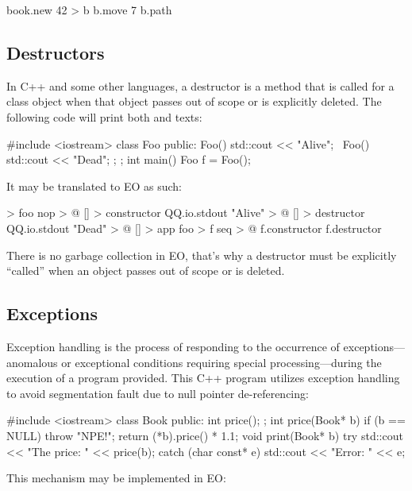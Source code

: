\documentclass[sigplan,11pt,nonacm,natbib=false]{acmart}
\begin{document}
\begin{ffcode}
book.new 42 > b
b.move 7
b.path
\end{ffcode}

\subsection{Destructors}
\label{sec:destructors}

In C++ and some other languages, a destructor is a method that is called for a class object when that object passes out of scope or is explicitly deleted. The following code will print both  and  texts:

\begin{ffcode}
#include <iostream>
class Foo {
public:
  Foo() { std::cout << "Alive"; }
  ~Foo() { std::cout << "Dead"; };
};
int main() {
  Foo f = Foo();
}
\end{ffcode}

It may be translated to EO as such:

\begin{ffcode}
[] > foo
  nop > @
  [] > constructor
    QQ.io.stdout "Alive" > @
  [] > destructor
    QQ.io.stdout "Dead" > @
[] > app
  foo > f
  seq > @
    f.constructor
    f.destructor
\end{ffcode}

There is no garbage collection in EO, that's why a destructor must be explicitly ``called'' when an object passes out of scope or is deleted.

\subsection{Exceptions}
\label{sec:exceptions}

Exception handling is the process of responding to the occurrence of exceptions---anomalous or exceptional conditions requiring special processing---during the execution of a program provided. This C++ program utilizes exception handling to avoid segmentation fault due to null pointer de-referencing:

\begin{ffcode}
#include <iostream>
class Book { public: int price(); };
int price(Book* b) {
  if (b == NULL) throw "NPE!";
  return (*b).price() * 1.1;
}
void print(Book* b) {
  try {
    std::cout << "The price: " << price(b);
  } catch (char const* e) {
    std::cout << "Error: " << e;
  }
}
\end{ffcode}

This mechanism may be implemented in EO:
\end{document}
